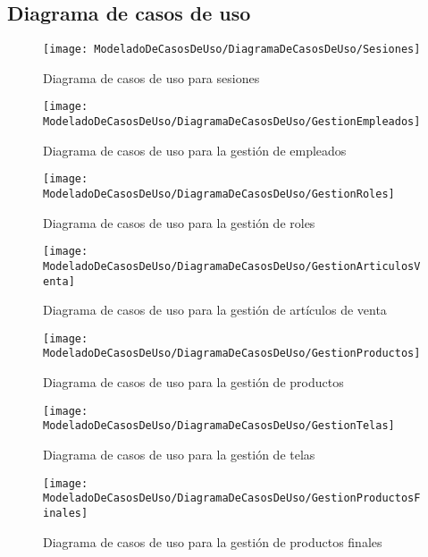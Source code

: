 	\subsection{Diagrama de casos de uso}
	\begin{figure}[H]
		\centering
		\texttt{[image: ModeladoDeCasosDeUso/DiagramaDeCasosDeUso/Sesiones]}
		\caption{Diagrama de casos de uso para sesiones}
	\label{fig:Sesiones}
	\end{figure}
	\begin{figure}[H]
		\centering
		\texttt{[image: ModeladoDeCasosDeUso/DiagramaDeCasosDeUso/GestionEmpleados]}
		\caption{Diagrama de casos de uso para la gestión de empleados}
	\label{fig:GestionEmpleados}
	\end{figure}
	\begin{figure}[H]
		\centering
		\texttt{[image: ModeladoDeCasosDeUso/DiagramaDeCasosDeUso/GestionRoles]}
		\caption{Diagrama de casos de uso para la gestión de roles}
	\label{fig:GestionRoles}
	\end{figure}
	\begin{figure}[H]
		\centering
		\texttt{[image: ModeladoDeCasosDeUso/DiagramaDeCasosDeUso/GestionArticulosVenta]}
		\caption{Diagrama de casos de uso para la gestión de artículos de venta}
	\label{fig:GestionArticulosVenta}
	\end{figure}
    \begin{figure}[H]
		\centering
		\texttt{[image: ModeladoDeCasosDeUso/DiagramaDeCasosDeUso/GestionProductos]}
		\caption{Diagrama de casos de uso para la gestión de productos}
	\label{fig:GestionProductos}
    \end{figure}
    \begin{figure}[H]
		\centering
		\texttt{[image: ModeladoDeCasosDeUso/DiagramaDeCasosDeUso/GestionTelas]}
		\caption{Diagrama de casos de uso para la gestión de telas}
	\label{fig:GestionTelas}
    \end{figure}
    \begin{figure}[H]
		\centering
		\texttt{[image: ModeladoDeCasosDeUso/DiagramaDeCasosDeUso/GestionProductosFinales]}
		\caption{Diagrama de casos de uso para la gestión de productos finales}
	\label{fig:GestionProductosFinales}
    \end{figure}
